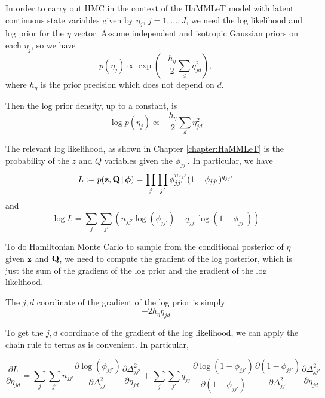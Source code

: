 In order to carry out HMC in the context of the HaMMLeT model with latent continuous state variables given by $\eta_j$, $j = 1, \dots, J$, we need the log likelihood and log prior for the $\eta$ vector.  Assume independent and isotropic Gaussian priors on each 
$\eta_{j}$, so we have
\begin{equation*}
  p(\eta_j) \propto \exp\left(-\frac{h_\eta}{2} \sum_{d} \eta_{jd}^2 \right),
\end{equation*}
where $h_{\eta}$ is the prior precision which does not depend on $d$.

Then the log prior density, up to a constant, is
\begin{equation*}
  \log p(\eta_j) \propto -\frac{h_{\eta}}{2} \sum_{d} \eta_{jd}^2
\end{equation*}

The relevant log likelihood, as shown in Chapter \ref{chapter:HaMMLeT} is
the probability of the $z$ and $Q$ variables given the
$\phi_{jj'}$.  In particular, we have
\begin{equation*}
  L := p(\mathbf{z}, \mathbf{Q} \, \vert \, \boldsymbol{\phi}) = \prod_{j} \prod_{j'} \phi_{jj'}^{n_{jj'}}(1 - \phi_{jj'})^{q_{jj'}}
\end{equation*}
and
\begin{equation*}
  \log L = \sum_{j} \sum_{j'} \left( n_{jj'} \log(\phi_{jj'}) +
    q_{jj'} \log(1 - \phi_{jj'})\right)
\end{equation*}

To do Hamiltonian Monte Carlo to sample from the conditional posterior
of $\eta$ given $\mathbf{z}$ and $\mathbf{Q}$, we need to compute the gradient of the
log posterior, which is just the sum of the gradient of the log prior
and the gradient of the log likelihood.

The $j,d$ coordinate of the gradient of the log prior is simply
\begin{equation*}
  -2h_{\eta} \eta_{jd}
\end{equation*}

To get the $j,d$ coordinate of the gradient of the log likelihood, we
can apply the chain rule to terms as is convenient.  In particular,

\begin{equation*}
  \frac{\partial L}{\partial \eta_{jd}}=\sum_{j} \sum_{j'} n_{jj'}
  \frac{\partial \log(\phi_{jj'})}{\partial \Delta_{jj'}^2}
  \frac{\partial \Delta_{jj'}^2}{\partial \eta_{jd}}+ \sum_{j}
  \sum_{j'} q_{jj'} \frac{\partial \log(1 - \phi_{jj'})}{\partial (1 -
    \phi_{jj'})}\frac{\partial (1 - \phi_{jj'})}{\partial
    \Delta_{jj'}^2} \frac{\partial \Delta_{jj'}^2}{\partial \eta_{jd}}
\end{equation*}

